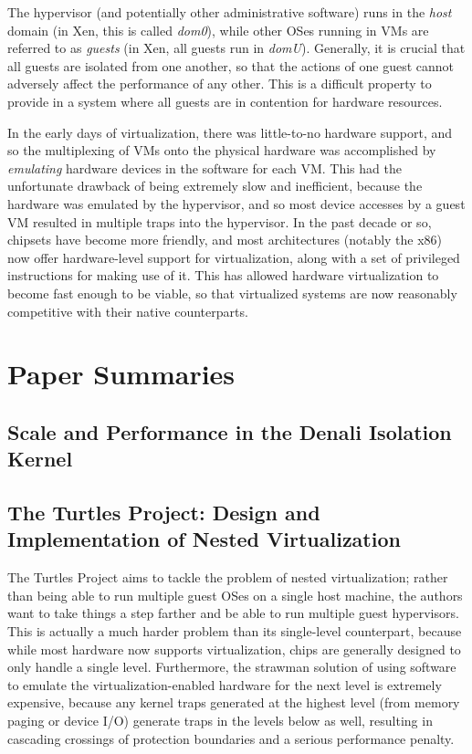 \documentclass[letterpaper, twocolumn]{article}
\begin{document}
The hypervisor (and potentially other administrative software) runs in the \emph{host}
domain (in Xen, this is called \emph{dom0}), while other OSes running in VMs are 
referred to as \emph{guests} (in Xen, all guests run in \emph{domU}).  Generally, it is
crucial that all guests are isolated from one another, so that the actions of one guest
cannot adversely affect the performance of any other.  This is a difficult property
to provide in a system where all guests are in contention for hardware resources.

In the early days of virtualization, there was little-to-no hardware support,
and so the multiplexing of VMs onto the physical hardware was accomplished by
\emph{emulating} hardware devices in the software for each VM.  This had the unfortunate
drawback of being extremely slow and inefficient, because the hardware was emulated by
the hypervisor, and so most device accesses by a guest VM resulted in multiple traps
into the hypervisor.  In the past decade or so, chipsets have become more friendly,
and most architectures (notably the x86) now offer hardware-level support for
virtualization, along with a set of privileged instructions for making use of it.
This has allowed hardware virtualization to become fast enough to be viable,
so that virtualized systems are now reasonably competitive with their native
counterparts.

\section{Paper Summaries}
\label{sec:summaries}

\subsection{Scale and Performance in the Denali Isolation Kernel}
\label{sec:summaries/denali}

\subsection{The Turtles Project: Design and Implementation of Nested Virtualization}
\label{sec:summaries/turtles}

The Turtles Project \cite{ref:turtles} aims to tackle the problem of
nested virtualization; rather than being able to run multiple guest OSes
on a single host machine, the authors want to take things a step farther
and be able to run multiple guest hypervisors.  This is actually a
much harder problem than its single-level counterpart, because while
most hardware now supports virtualization, chips are generally designed
to only handle a single level.  Furthermore, the strawman solution of
using software to emulate the virtualization-enabled hardware for the next level is
extremely expensive, because any kernel traps generated at the highest
level (from memory paging or device I/O) generate traps in the levels
below as well, resulting in cascading crossings of protection
boundaries and a serious performance penalty.
\end{document}
